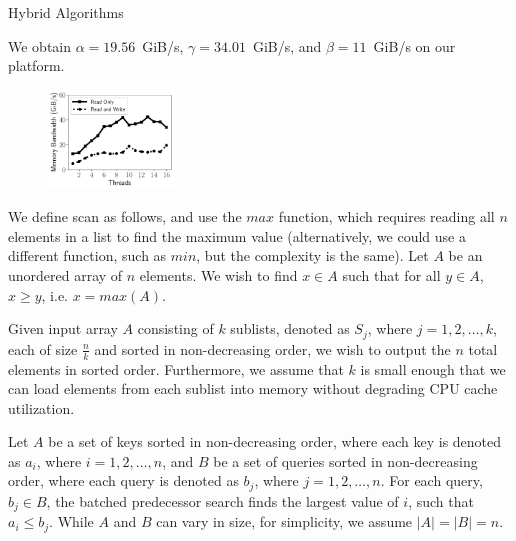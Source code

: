 \documentclass[final]{beamer}
\newlength{\colwidth}
\begin{document}
\begin{frame}[t]
\begin{columns}[t]
\begin{column}{\colwidth}
\begin{block}{Hybrid Algorithms}
\begin{description}[font=$\bullet$~\normalfont\scshape\color{red!50!black}]
\item We obtain $\alpha=19.56$~GiB/s, $\gamma=34.01$~GiB/s, and $\beta=11$~GiB/s on our platform. 
\end{description} 

\begin{figure}[htp]
\centering
    \includegraphics[height=0.2\textwidth, width=0.30\textwidth, trim={0.5cm 0.5cm 0.5cm 1cm}]{figures/microbenchmarks_time_vs_threads.pdf}	
   \label{fig:mem_bandwidth_scalability}
\end{figure}


We define scan as follows, and use the $max$ function, which requires reading all $n$ elements in a list to find the maximum value (alternatively,
we could use a different function, such as $min$, but the complexity is the same).
Let $A$ be an unordered array of $n$ elements. We wish to find $x \in A$ such that for all $y \in A$, $x \ge y$, i.e. $x = max(A)$.



   Given input array $A$ consisting of $k$ sublists, denoted as $S_j$, 
   where $j=1, 2,\ldots,k$, each of size  $\frac{n}{k}$ and sorted in non-decreasing order, we wish to output the $n$ total elements 
   in sorted order. Furthermore, we assume that $k$ is small enough that we can load elements 
   from each sublist into memory without degrading CPU cache utilization.


   Let $A$ be a set of keys sorted in non-decreasing order,  
   where each key is denoted as $a_i$, where $i=1, 2,\ldots,n$, and $B$ be a set of queries sorted in non-decreasing order, 
   where each query is denoted as $b_j$, where $j=1, 2,\ldots,n$. For each query, $b_j\in B$, the batched predecessor search 
   finds the largest value of $i$, such that $a_i\leq b_j$. While $A$ and $B$ can vary in size, for simplicity, we assume $|A|=|B|=n$.



  \end{block}

\end{column}


\end{columns}
\end{frame}
\end{document}

